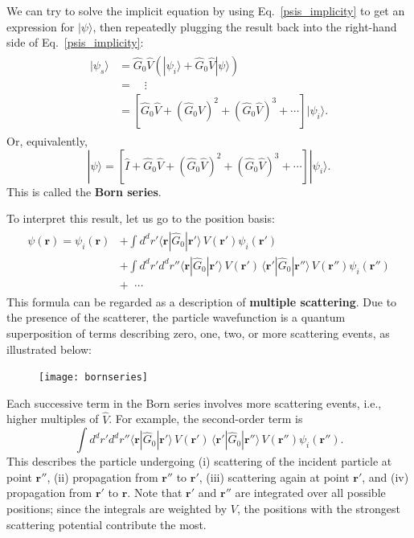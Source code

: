 \documentclass[pra,12pt]{revtex4}
\begin{document}
We can try to solve the implicit equation by using
Eq.~\eqref{psis_implicity} to get an expression for $|\psi\rangle$,
then repeatedly plugging the result back into the right-hand side of
Eq.~\eqref{psis_implicity}:
\begin{align}
  \begin{aligned}|\psi_s\rangle &= \hat{G}_0 \hat{V} \left(|\psi_i\rangle + \hat{G}_0 \hat{V}|\psi\rangle\right) \\ &= \quad \vdots \\ &= \left[\hat{G}_0 \hat{V} + (\hat{G}_0 \hat{V})^2 + (\hat{G}_0 \hat{V})^3 + \cdots\right]|\psi_i\rangle.\end{aligned}
\end{align}
Or, equivalently,
\begin{equation}
  |\psi\rangle = \left[\hat{I} + \hat{G}_0 \hat{V} + (\hat{G}_0 \hat{V})^2 + (\hat{G}_0 \hat{V})^3 + \cdots\right]|\psi_i\rangle.
  \label{bornseries}
\end{equation}
This is called the \textbf{Born series}.

To interpret this result, let us go to the position basis:
\begin{align}
  \begin{aligned}\psi(\mathbf{r}) = \psi_i(\mathbf{r}) &+ \int d^dr' \langle \mathbf{r} | \hat{G}_0 |\mathbf{r}'\rangle\, V(\mathbf{r}') \psi_i(\mathbf{r}') \\ &+ \int d^dr' d^dr'' \langle \mathbf{r} | \hat{G}_0 |\mathbf{r}'\rangle\, V(\mathbf{r}') \, \langle \mathbf{r}' | \hat{G}_0 |\mathbf{r}''\rangle \, V(\mathbf{r}'') \psi_i(\mathbf{r}'') \\ &+ \;\;\cdots\end{aligned}
\end{align}
This formula can be regarded as a description of \textbf{multiple
  scattering}.  Due to the presence of the scatterer, the particle
wavefunction is a quantum superposition of terms describing zero, one,
two, or more scattering events, as illustrated below:

\begin{figure}[h!]
  \centering\texttt{[image: bornseries]}
\end{figure}

\noindent
Each successive term in the Born series involves more scattering
events, i.e., higher multiples of $\hat{V}$.  For example, the
second-order term is
\begin{equation*}
  \int d^dr' d^dr'' \langle \mathbf{r} | \hat{G}_0 |\mathbf{r}'\rangle\, V(\mathbf{r}') \, \langle \mathbf{r}' | \hat{G}_0 |\mathbf{r}''\rangle \, V(\mathbf{r}'') \psi_i(\mathbf{r}'').
\end{equation*}
This describes the particle undergoing (i) scattering of the incident
particle at point $\mathbf{r}''$, (ii) propagation from $\mathbf{r}''$
to $\mathbf{r}'$, (iii) scattering again at point $\mathbf{r}'$, and
(iv) propagation from $\mathbf{r}'$ to $\mathbf{r}$.  Note that
$\mathbf{r}'$ and $\mathbf{r}''$ are integrated over all possible
positions; since the integrals are weighted by $V$, the positions with
the strongest scattering potential contribute the most.
\end{document}
